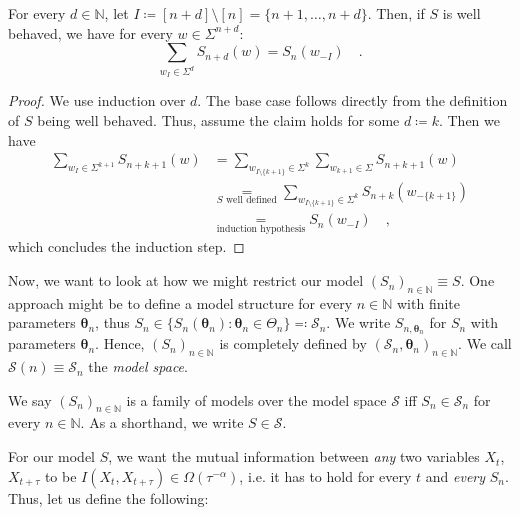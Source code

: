 \documentclass[../../main.tex]{subfiles}
\begin{document}
    \begin{lemma}
        For every $d \in \mathbb{N}$, let $I \coloneqq [n + d] \setminus [n] = \{ n+1, \dots, n + d \}$. Then, if $S$ is well behaved, we have for every $w \in \Sigma^{n + d}$:
        \[
            \sum_{w_I \in \Sigma^d} S_{n + d}(w) = S_n(w_{-I}) \quad .
        \]
    \end{lemma}
    \begin{proof}
        We use induction over $d$. The base case follows directly from the definition of $S$ being well behaved. Thus, assume the claim holds for some $d \coloneqq k$. Then we have
        \begin{align*}
            \sum_{w_I \in \Sigma^{k + 1}} S_{n + k + 1}(w) &= \sum_{w_{I \setminus \{ k + 1 \}} \in \Sigma^{k}} \sum_{w_{k + 1} \in \Sigma} S_{n + k + 1}(w) \\
            &\underset{S \text{ well defined}}{=} \sum_{w_{I \setminus \{ k + 1 \}} \in \Sigma^{k}} S_{n + k}(w_{-\{ k + 1 \}}) \\
            &\underset{\text{induction hypothesis}}{=} S_n(w_{-I}) \quad ,
        \end{align*}
        which concludes the induction step.
    \end{proof}

    Now, we want to look at how we might restrict our model $(S_n)_{n \in \mathbb{N}} \equiv S$. One approach might be to define a model structure for every $n \in \mathbb{N}$ with finite parameters $\bm{\theta}_n$, thus $S_n \in \{ S_n(\bm{\theta}_n) : \bm{\theta}_n \in \Theta_n \} \eqqcolon \mathcal{S}_n$. We write $S_{n, \bm{\theta}_n}$ for $S_n$ with parameters $\bm{\theta}_n$. Hence, $(S_n)_{n \in \mathbb{N}}$ is completely defined by $(\mathcal{S}_n, \bm{\theta}_n)_{n \in \mathbb{N}}$. We call $\mathcal{S}(n) \equiv \mathcal{S}_n$ the \emph{model space}.

    \begin{definition}
        We say $(S_n)_{n \in \mathbb{N}}$ is a family of models over the model space $\mathcal{S}$ iff $S_n \in \mathcal{S}_n$ for every $n \in \mathbb{N}$. As a shorthand, we write $S \in \mathcal{S}$.
    \end{definition}

    For our model $S$, we want the mutual information between \emph{any} two variables $X_t$, $X_{t + \tau}$ to be $I(X_t, X_{t + \tau}) \in \Omega(\tau^{-\alpha})$, i.e. it has to hold for every $t$ and \emph{every} $S_n$. Thus, let us define the following:
\end{document}
